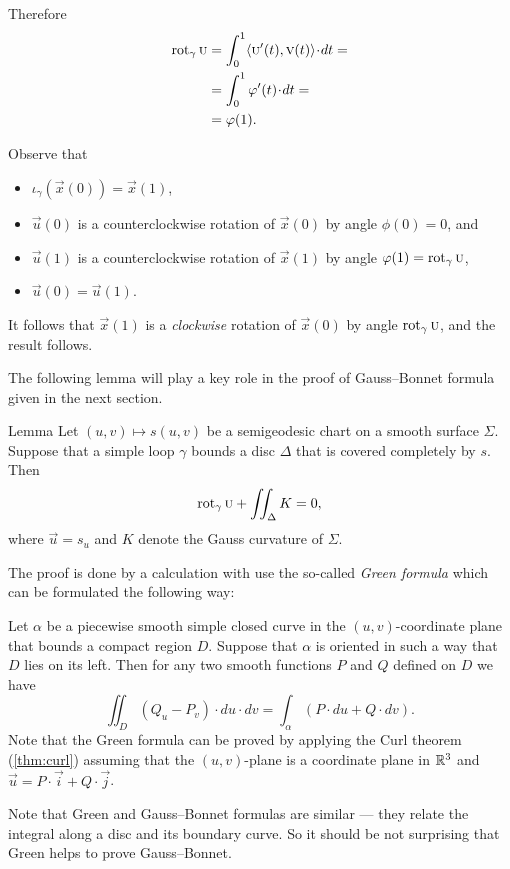 Therefore
\begin{align*}
\rot_\gamma\vec u&=\int_0^1\langle\vec u'(t),\vec v(t)\rangle\cdot dt=
\\
&=\int_0^1\phi'(t)\cdot dt=
\\
&=\phi(1).
\end{align*}

Observe that 
\begin{itemize}
\item $\iota_\gamma(\vec x(0))=\vec x(1)$,

\item $\vec u(0)$ is a counterclockwise rotation of $\vec x(0)$ by angle $\phi(0)=0$, and 

\item $\vec u(1)$ is a counterclockwise rotation of $\vec x(1)$ by angle $\phi(1)\z=\rot_\gamma\vec u$,

\item $\vec u(0)=\vec u(1)$.
\end{itemize}
It follows that $\vec x(1)$ is a {}\emph{clockwise} rotation of $\vec x(0)$ by angle $\mathop{\rm rot}\nolimits_\gamma\textsc u$, and the result follows.
\qeds

The following lemma will play a key role in the proof of Gauss--Bonnet formula given in the next section.

\begin{thm}{Lemma}\label{lem:rotation-semigeoesic}
Let $(u,v)\mapsto s(u,v)$ be a semigeodesic chart on a smooth surface $\Sigma$.
Suppose that a simple loop $\gamma$ bounds a disc $\Delta$ that is covered completely by $s$.
Then 
\[\mathop{\rm rot}\nolimits_\gamma\textsc u+\iint_\Delta K=0,\]
where $\vec u=s_u$ and $K$ denote the Gauss curvature of $\Sigma$.
\end{thm}

The proof is done by a calculation with use the so-called \emph{Green formula} which can be formulated the following way:

Let $\alpha$ be a piecewise smooth simple closed curve in the $(u,v)$-coordinate plane that bounds a compact region $D$.
Suppose that $\alpha$ is oriented in such a way that $D$ lies on its left.
Then for any two smooth functions $P$ and $Q$ defined on $D$ we have
\[\iint_D (Q_u- P_v)\cdot du\cdot dv=\int_\alpha (P\cdot du+Q\cdot dv).\]
Note that the Green formula can be proved by applying the Curl theorem (\ref{thm:curl}) assuming that the $(u,v)$-plane is a coordinate plane in $\mathbb{R}^3$ and $\vec u=P\cdot\vec i+Q\cdot \vec j$.

Note that Green and Gauss--Bonnet formulas are similar --- they relate the integral along a disc and its boundary curve.
So it should be not surprising that Green helps to prove Gauss--Bonnet.

